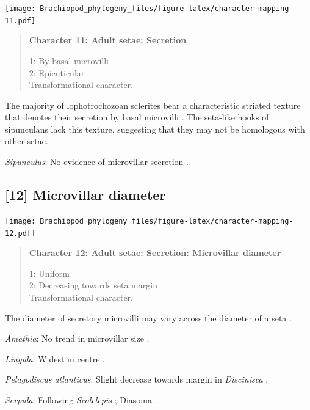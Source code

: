 \documentclass[openany]{book}
\begin{document}
\texttt{[image: Brachiopod\_phylogeny\_files/figure-latex/character-mapping-11.pdf]}

\begin{quote}
\textbf{Character 11: Adult setae: Secretion}

1: By basal microvilli\\
2: Epicuticular\\
Transformational character.
\end{quote}

The majority of lophotrochozoan sclerites bear a characteristic striated
texture that denotes their secretion by basal microvilli
\citep{Butterfield1990}. The seta-like hooks of sipunculans lack this
texture, suggesting that they may not be homologous with other setae.

\hypertarget{Sipunculus-coding-11}{}
\emph{Sipunculus}: No evidence of microvillar secretion
\citep[e.g.][]{Schulze2005}.

\subsection*{{[}12{]} Microvillar diameter}\label{microvillar-diameter}

\texttt{[image: Brachiopod\_phylogeny\_files/figure-latex/character-mapping-12.pdf]}

\begin{quote}
\textbf{Character 12: Adult setae: Secretion: Microvillar diameter}

1: Uniform\\
2: Decreasing towards seta margin\\
Transformational character.
\end{quote}

The diameter of secretory microvilli may vary across the diameter of a
seta \citep{Smith2014}.

\hypertarget{Amathia-coding-12}{}
\emph{Amathia}: No trend in microvillar size \citep{Gordon1975}.

\hypertarget{Lingula-coding-12}{}
\emph{Lingula}: Widest in centre \citep{Luter2000}.

\hypertarget{Pelagodiscus_atlanticus-coding-12}{}
\emph{Pelagodiscus atlanticus}: Slight decrease towards margin in
\emph{Discinisca} \citep{Luter2003}.

\hypertarget{Serpula-coding-12}{}
\emph{Serpula}: Following \emph{Scolelepis} \citep{Hausen2005}; Diasoma
\citep{Orrhage1971}.
\end{document}

